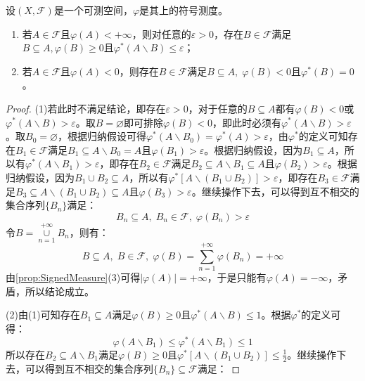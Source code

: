 \begin{lemma}
	设$(X,\mathscr{F})$是一个可测空间，$\varphi$是其上的符号测度。
	\begin{enumerate}
		\item 若$A\in\mathscr{F}$且$\varphi(A)<+\infty$，则对任意的$\varepsilon>0$，存在$B\in\mathscr{F}$满足$B\subseteq A,\varphi(B)\geqslant0$且$\varphi^*(A\backslash B)\leqslant\varepsilon$；
		\item 若$A\in\mathscr{F}$且$\varphi(A)<0$，则存在$B\in\mathscr{F}$满足$B\subseteq A,\;\varphi(B)<0$且$\varphi^*(B)=0$。
	\end{enumerate}
\end{lemma}
\begin{proof}
	(1)若此时不满足结论，即存在$\varepsilon>0$，对于任意的$B\subseteq A$都有$\varphi(B)<0$或$\varphi^*(A\backslash B)>\varepsilon$。取$B=\varnothing$即可排除$\varphi(B)<0$，即此时必须有$\varphi^*(A\backslash B)>\varepsilon$。取$B_0=\varnothing$，根据归纳假设可得$\varphi^*(A\backslash B_0)=\varphi^*(A)>\varepsilon$，由$\varphi^*$的定义可知存在$B_1\in\mathscr{F}$满足$B_1\subseteq A\backslash B_0=A$且$\varphi(B_1)>\varepsilon$。根据归纳假设，因为$B_1\subseteq A$，所以有$\varphi^*(A\backslash B_1)>\varepsilon$，即存在$B_2\in\mathscr{F}$满足$B_2\subseteq A\backslash B_1\subseteq A$且$\varphi(B_2)>\varepsilon$。根据归纳假设，因为$B_1\cup B_2\subseteq A$，所以有$\varphi^*[A\backslash(B_1\cup B_2)]>\varepsilon$，即存在$B_3\in\mathscr{F}$满足$B_3\subseteq A\backslash(B_1\cup B_2)\subseteq A$且$\varphi(B_3)>\varepsilon$。继续操作下去，可以得到互不相交的集合序列$\{B_n\}$满足：
	\begin{equation*}
		B_n\subseteq A,\;B_n\in\mathscr{F},\;\varphi(B_n)>\varepsilon
	\end{equation*}
	令$B=\underset{n=1}{\overset{+\infty}{\cup}}B_n$，则有：
	\begin{equation*}
		B\subseteq A,\;B\in\mathscr{F},\;\varphi(B)=\sum_{n=1}^{+\infty}\varphi(B_n)=+\infty
	\end{equation*}
	由\cref{prop:SignedMeasure}(3)可得$|\varphi(A)|=+\infty$，于是只能有$\varphi(A)=-\infty$，矛盾，所以结论成立。\par
	(2)由(1)可知存在$B_1\subseteq A$满足$\varphi(B)\geqslant0$且$\varphi^*(A\backslash B)\leqslant1$。根据$\varphi^*$的定义可得：
	\begin{equation*}
		\varphi(A\backslash B_1)\leqslant\varphi^*(A\backslash B_1)\leqslant1
	\end{equation*}
	所以存在$B_2\subseteq A\backslash B_1$满足$\varphi(B)\geqslant0$且$\varphi^*[A\backslash (B_1\cup B_2)]\leqslant\frac{1}{2}$。继续操作下去，可以得到互不相交的集合序列$\{B_n\}\subseteq\mathscr{F}$满足：

\end{proof}
